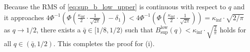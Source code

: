\documentclass[journal]{IEEEtran}
\renewcommand{\leq}{\leqslant} %
\theoremstyle{definition}
\newcommand{\yohe}[1]{{\color{cyan}Y.A.: #1}}
\begin{document}
Because the RMS of \eqref{eq:sup_b_low_upper} is continuous with respect to $q$ and it approaches $4 \Phi^{-1} \left( \Phi\left(\frac{\kappa_{\inf}}{2}\cdot\frac{1}{\sqrt{2\pi}}\right) - \delta_1 \right) <
4 \Phi^{-1} \left( \Phi\left(\frac{\kappa_{\inf}}{2}\cdot\frac{1}{\sqrt{2\pi}}\right) \right) = \kappa_{\inf}\cdot \sqrt{2 / \pi}$ as $q \to 1/2$, there exists a $\bar{q} \in [1/8, 1/2)$ such that 
$B_{\sup}^\text{low}(q) < \kappa_{\inf}\cdot\sqrt{\frac{2}{\pi}}$ holds for all $q \in (\bar{q}, 1/2)$. 
This completes the proof for (i).
\end{document}
